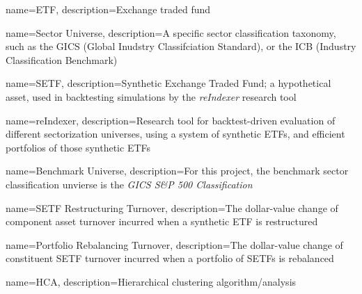 \makeglossaries



{
    name=ETF,
    description={Exchange traded fund}
}


{
    name=Sector Universe,
    description={A specific sector classification taxonomy, such as the GICS (Global Inudstry Classifciation Standard), or the ICB (Industry Classification Benchmark)}
}

{
    name=SETF,
    description={Synthetic Exchange Traded Fund; a hypothetical asset, used in backtesting simulations by the \textit{reIndexer} research tool}
}

{
    name=reIndexer,
    description={Research tool for backtest-driven evaluation of different sectorization universes, using a system of synthetic ETFs, and efficient portfolios of those synthetic ETFs}
}

{
    name=Benchmark Universe,
    description={For this project, the benchmark sector classification unvierse is the \textit{GICS S\&P 500 Classification}}
}

{
    name=SETF Restructuring Turnover,
    description={The dollar-value change of component asset turnover incurred when a synthetic ETF is restructured}
}

{
    name=Portfolio Rebalancing Turnover,
    description={The dollar-value change of constituent SETF turnover incurred when a portfolio of SETFs is rebalanced}
}

{
    name=HCA,
    description={Hierarchical clustering algorithm/analysis}
}